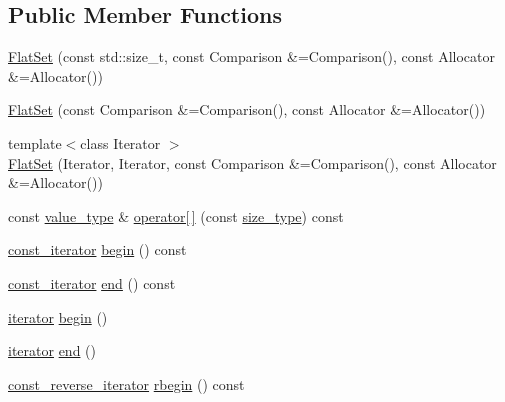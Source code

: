\subsection*{Public Member Functions}
\begin{DoxyCompactItemize}
\item 
\hyperlink{classnifty_1_1container_1_1FlatSet_a8fdc9c4a6bf11be6e7be0d81d450ae47}{Flat\+Set} (const std\+::size\+\_\+t, const Comparison \&=Comparison(), const Allocator \&=Allocator())
\item 
\hyperlink{classnifty_1_1container_1_1FlatSet_a1f36a0b023633f58bf90e0660f0bc16c}{Flat\+Set} (const Comparison \&=Comparison(), const Allocator \&=Allocator())
\item 
{\footnotesize template$<$class Iterator $>$ }\\\hyperlink{classnifty_1_1container_1_1FlatSet_a4ac0179c196a52ca4cbe2c82b5b7e4fa}{Flat\+Set} (Iterator, Iterator, const Comparison \&=Comparison(), const Allocator \&=Allocator())
\item 
const \hyperlink{classnifty_1_1container_1_1FlatSet_a2366c665ec49d585ff8a77362468d82d}{value\+\_\+type} \& \hyperlink{classnifty_1_1container_1_1FlatSet_ab27d508690712397b377227cfd8341fc}{operator\mbox{[}$\,$\mbox{]}} (const \hyperlink{classnifty_1_1container_1_1FlatSet_a06ddeba4c1be37279497ed698dfeb812}{size\+\_\+type}) const
\item 
\hyperlink{classnifty_1_1container_1_1FlatSet_a0f4cd26da060859b18742abfd534aa24}{const\+\_\+iterator} \hyperlink{classnifty_1_1container_1_1FlatSet_a08126138beb50522a6ff9e16f242c08e}{begin} () const
\item 
\hyperlink{classnifty_1_1container_1_1FlatSet_a0f4cd26da060859b18742abfd534aa24}{const\+\_\+iterator} \hyperlink{classnifty_1_1container_1_1FlatSet_aecdce54d4d18b3b7bfc4605aa9486883}{end} () const
\item 
\hyperlink{classnifty_1_1container_1_1FlatSet_a9c7fd20cd6b1878ccb8a7e068072c795}{iterator} \hyperlink{classnifty_1_1container_1_1FlatSet_a2965a5b139947cf36bb90d594d3cb6c1}{begin} ()
\item 
\hyperlink{classnifty_1_1container_1_1FlatSet_a9c7fd20cd6b1878ccb8a7e068072c795}{iterator} \hyperlink{classnifty_1_1container_1_1FlatSet_a93ce7a3126ef6e45f1d82cd71c335741}{end} ()
\item 
\hyperlink{classnifty_1_1container_1_1FlatSet_ab7858d2e6eeeb311e21988d9b4a5b802}{const\+\_\+reverse\+\_\+iterator} \hyperlink{classnifty_1_1container_1_1FlatSet_a612b58eb7cf9c93424ead2af4ec1b8be}{rbegin} () const
\item 

\end{DoxyCompactItemize}
